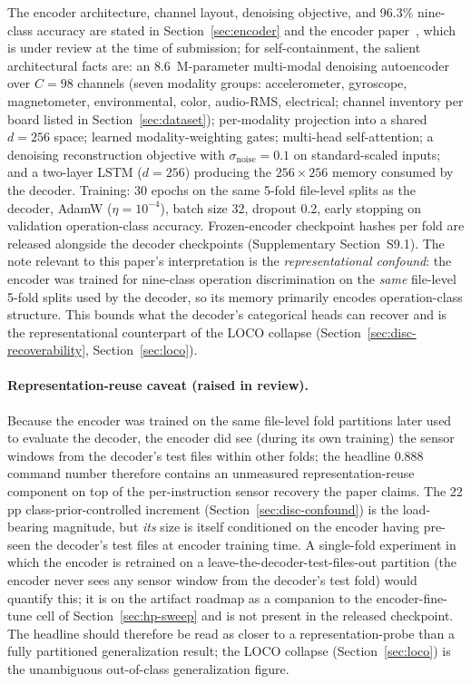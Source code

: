 \documentclass[sensors,article,submit,moreauthors,pdftex]{Definitions/mdpi}
\begin{document}
The encoder architecture, channel layout, denoising objective, and 96.3\% nine-class accuracy are stated in Section~\ref{sec:encoder} and the encoder paper~\cite{encoder_paper}, which is under review at the time of submission; for self-containment, the salient architectural facts are: an 8.6~M-parameter multi-modal denoising autoencoder over $C\!=\!98$ channels (seven modality groups: accelerometer, gyroscope, magnetometer, environmental, color, audio-RMS, electrical; channel inventory per board listed in Section~\ref{sec:dataset}); per-modality projection into a shared $d\!=\!256$ space; learned modality-weighting gates; multi-head self-attention; a denoising reconstruction objective with $\sigma_{\text{noise}}\!=\!0.1$ on standard-scaled inputs; and a two-layer LSTM ($d\!=\!256$) producing the $256\!\times\!256$ memory consumed by the decoder. Training: 30 epochs on the same 5-fold file-level splits as the decoder, AdamW ($\eta\!=\!10^{-4}$), batch size 32, dropout 0.2, early stopping on validation operation-class accuracy. Frozen-encoder checkpoint hashes per fold are released alongside the decoder checkpoints (Supplementary Section~S9.1). The note relevant to this paper's interpretation is the \emph{representational confound}: the encoder was trained for nine-class operation discrimination on the \emph{same} file-level 5-fold splits used by the decoder, so its memory primarily encodes operation-class structure. This bounds what the decoder's categorical heads can recover and is the representational counterpart of the LOCO collapse (Section~\ref{sec:disc-recoverability}, Section~\ref{sec:loco}). \paragraph{Representation-reuse caveat (raised in review).} Because the encoder was trained on the same file-level fold partitions later used to evaluate the decoder, the encoder did see (during its own training) the sensor windows from the decoder's test files within other folds; the headline 0.888 command number therefore contains an unmeasured representation-reuse component on top of the per-instruction sensor recovery the paper claims. The 22 pp class-prior-controlled increment (Section~\ref{sec:disc-confound}) is the load-bearing magnitude, but \emph{its} size is itself conditioned on the encoder having pre-seen the decoder's test files at encoder training time. A single-fold experiment in which the encoder is retrained on a leave-the-decoder-test-files-out partition (the encoder never sees any sensor window from the decoder's test fold) would quantify this; it is on the artifact roadmap as a companion to the encoder-fine-tune cell of Section~\ref{sec:hp-sweep} and is not present in the released checkpoint. The headline should therefore be read as closer to a representation-probe than a fully partitioned generalization result; the LOCO collapse (Section~\ref{sec:loco}) is the unambiguous out-of-class generalization figure.
\end{document}
